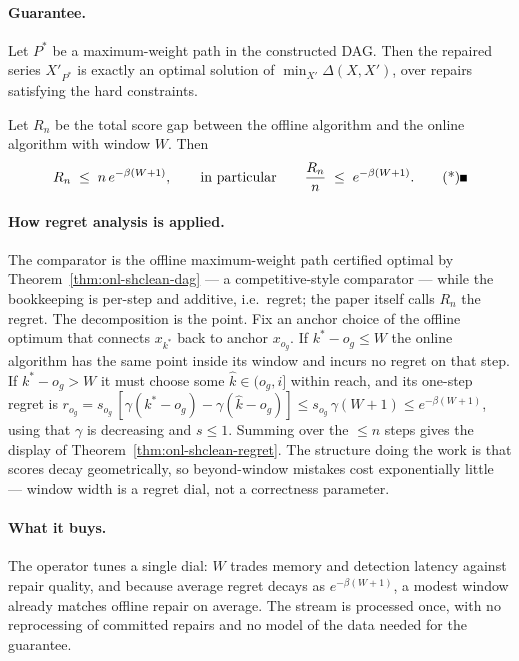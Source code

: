 \paragraph{Guarantee.}

\begin{theorem}
\label{thm:onl-shclean-dag}
Let $P^*$ be a maximum-weight path in the constructed DAG. Then the repaired
series $X'_{P^*}$ is exactly an optimal solution of
$\min_{X'}\Delta(X,X')$, over repairs satisfying the hard constraints. \eop
\end{theorem}

\begin{theorem}
\label{thm:onl-shclean-regret}
Let $R_n$ be the total score gap between the offline algorithm and the online
algorithm with window $W$. Then
\[
R_n \;\le\; n\,e^{-\beta(W+1)},
\qquad\text{in particular}\qquad
\frac{R_n}{n} \;\le\; e^{-\beta(W+1)}. \eopm
\]
\end{theorem}

\paragraph{How regret analysis is applied.}
The comparator is the offline maximum-weight path certified optimal by
Theorem~\ref{thm:onl-shclean-dag} --- a competitive-style comparator --- while
the bookkeeping is per-step and additive, i.e.\ regret; the paper itself calls
$R_n$ the regret. The decomposition is the point. Fix an anchor choice of the
offline optimum that connects $x_{k^*}$ back to anchor $x_{o_g}$. If
$k^* - o_g \le W$ the online algorithm has the same point inside its window
and incurs no regret on that step. If $k^* - o_g > W$ it must choose some
$\hat k \in (o_g, i]$ within reach, and its one-step regret is
$r_{o_g} = s_{o_g}\,[\gamma(k^* - o_g) - \gamma(\hat k - o_g)] \le s_{o_g}\,
\gamma(W+1) \le e^{-\beta(W+1)}$, using that $\gamma$ is decreasing and $s \le
1$. Summing over the $\le n$ steps gives the display of
Theorem~\ref{thm:onl-shclean-regret}. The structure doing the work is that
scores decay geometrically, so beyond-window mistakes cost exponentially
little --- window width is a regret dial, not a correctness parameter.

\paragraph{What it buys.}
The operator tunes a single dial: $W$ trades memory and detection latency
against repair quality, and because average regret decays as $e^{-\beta(W+1)}$,
a modest window already matches offline repair on average. The stream is
processed once, with no reprocessing of committed repairs and no model of the
data needed for the guarantee.

